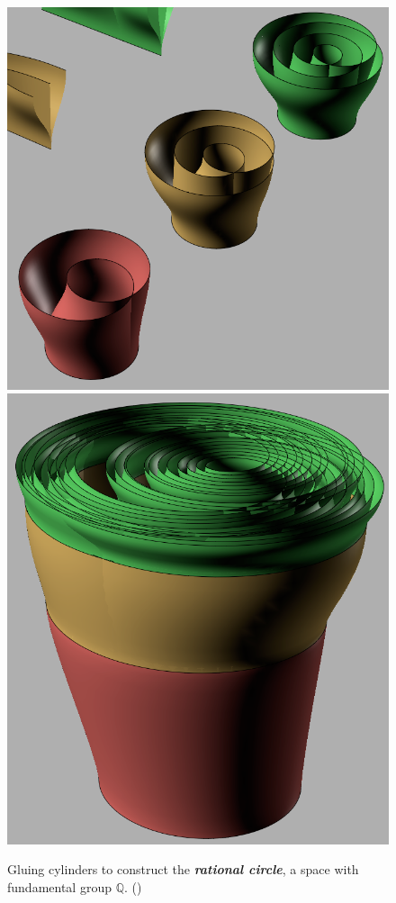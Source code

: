 \documentclass{article}
\newcommand{\Q}{\mathbb{Q}}
\begin{document}
\begin{figure}[H]
	\centering
	\includegraphics[width=0.355\linewidth]{rational-circle1}\hspace{2cm}
	\includegraphics[width=0.3\linewidth]{rational-circle2}
	\caption*{Gluing cylinders to construct the \textbf{\textit{rational circle}}, a space with fundamental group $\Q$. (\cite{rational-circle})}
\end{figure}
\end{document}
